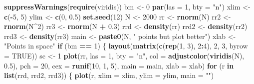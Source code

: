 \documentclass[portrait]{article}
\newenvironment{Shaded}{\begin{snugshade}}{\end{snugshade}}
\newcommand{\KeywordTok}[1]{\textcolor[rgb]{0.13,0.29,0.53}{\textbf{#1}}}
\newcommand{\DataTypeTok}[1]{\textcolor[rgb]{0.13,0.29,0.53}{#1}}
\newcommand{\DecValTok}[1]{\textcolor[rgb]{0.00,0.00,0.81}{#1}}
\newcommand{\FloatTok}[1]{\textcolor[rgb]{0.00,0.00,0.81}{#1}}
\newcommand{\StringTok}[1]{\textcolor[rgb]{0.31,0.60,0.02}{#1}}
\newcommand{\OtherTok}[1]{\textcolor[rgb]{0.56,0.35,0.01}{#1}}
\newcommand{\ControlFlowTok}[1]{\textcolor[rgb]{0.13,0.29,0.53}{\textbf{#1}}}
\newcommand{\OperatorTok}[1]{\textcolor[rgb]{0.81,0.36,0.00}{\textbf{#1}}}
\newcommand{\NormalTok}[1]{#1}
\begin{document}
\begin{Shaded}
\begin{Highlighting}[]
\KeywordTok{suppressWarnings}\NormalTok{(}\KeywordTok{require}\NormalTok{(viridis))}
\NormalTok{bm <-}\StringTok{ }\DecValTok{0}
\KeywordTok{par}\NormalTok{(}\DataTypeTok{las =} \DecValTok{1}\NormalTok{, }\DataTypeTok{bty =} \StringTok{"n"}\NormalTok{)}
\NormalTok{xlim <-}\StringTok{ }\KeywordTok{c}\NormalTok{(}\OperatorTok{-}\DecValTok{5}\NormalTok{, }\DecValTok{5}\NormalTok{)}
\NormalTok{ylim <-}\StringTok{ }\KeywordTok{c}\NormalTok{(}\DecValTok{0}\NormalTok{, }\FloatTok{0.5}\NormalTok{)}
\KeywordTok{set.seed}\NormalTok{(}\DecValTok{12}\NormalTok{)}
\NormalTok{N <-}\StringTok{ }\DecValTok{2000}
\NormalTok{rr <-}\StringTok{ }\KeywordTok{rnorm}\NormalTok{(N)}
\NormalTok{rr2 <-}\StringTok{ }\KeywordTok{rnorm}\NormalTok{(N}\OperatorTok{^}\DecValTok{2}\NormalTok{)}
\NormalTok{rr3 <-}\StringTok{ }\KeywordTok{rnorm}\NormalTok{(N }\OperatorTok{+}\StringTok{ }\FloatTok{0.3}\NormalTok{)}
\NormalTok{rrd <-}\StringTok{ }\KeywordTok{density}\NormalTok{(rr)}
\NormalTok{rrd2 <-}\StringTok{ }\KeywordTok{density}\NormalTok{(rr2)}
\NormalTok{rrd3 <-}\StringTok{ }\KeywordTok{density}\NormalTok{(rr3)}
\NormalTok{main <-}\StringTok{ }\KeywordTok{paste0}\NormalTok{(N, }\StringTok{" points but plot better"}\NormalTok{)}
\NormalTok{xlab <-}\StringTok{ "Points in space"}
\ControlFlowTok{if}\NormalTok{ (bm }\OperatorTok{==}\StringTok{ }\DecValTok{1}\NormalTok{) \{}
    \KeywordTok{layout}\NormalTok{(}\KeywordTok{matrix}\NormalTok{(}\KeywordTok{c}\NormalTok{(}\KeywordTok{rep}\NormalTok{(}\DecValTok{1}\NormalTok{, }\DecValTok{3}\NormalTok{), }\DecValTok{2}\OperatorTok{:}\DecValTok{4}\NormalTok{), }\DecValTok{2}\NormalTok{, }\DecValTok{3}\NormalTok{, }\DataTypeTok{byrow =} \OtherTok{TRUE}\NormalTok{))}
\NormalTok{    sc <-}\StringTok{ }\DecValTok{1}
    \KeywordTok{plot}\NormalTok{(rr, }\DataTypeTok{las =} \DecValTok{1}\NormalTok{, }\DataTypeTok{bty =} \StringTok{"n"}\NormalTok{, }\DataTypeTok{col =} \KeywordTok{adjustcolor}\NormalTok{(}\KeywordTok{viridis}\NormalTok{(N), }\FloatTok{0.5}\NormalTok{), }\DataTypeTok{pch =} \DecValTok{20}\NormalTok{, }\DataTypeTok{cex =} \KeywordTok{runif}\NormalTok{(}\DecValTok{10}\NormalTok{, }\DecValTok{1}\NormalTok{, }\DecValTok{5}\NormalTok{), }
        \DataTypeTok{main =}\NormalTok{ main, }\DataTypeTok{xlab =}\NormalTok{ xlab)}
    \ControlFlowTok{for}\NormalTok{ (r }\ControlFlowTok{in} \KeywordTok{list}\NormalTok{(rrd, rrd2, rrd3)) \{}
        \KeywordTok{plot}\NormalTok{(r, }\DataTypeTok{xlim =}\NormalTok{ xlim, }\DataTypeTok{ylim =}\NormalTok{ ylim, }\DataTypeTok{main =} \StringTok{""}\NormalTok{)}

\end{Highlighting}
\end{Shaded}
\end{document}
